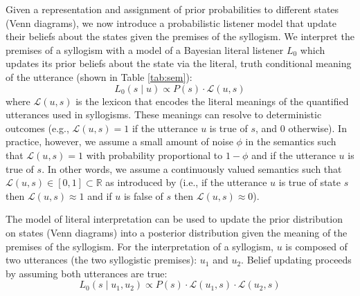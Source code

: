 \documentclass[floatsintext, doc]{apa6}
\begin{document}
Given a representation and assignment of prior probabilities to different states (Venn diagrams), we now introduce a probabilistic listener model that update their beliefs about the states given the premises of the syllogism. 
We interpret the premises of a syllogism with a model of a Bayesian literal listener $L_0$ which updates its prior beliefs about the state via the literal, truth conditional meaning of the utterance (shown in Table \ref{tab:sem}):
\begin{equation}
L_0(s \mid u ) \propto P(s)\cdot \mathcal{L}(u, s) 
\label{eq:L0}
\end{equation}
\noindent where $\mathcal{L}(u, s)$ is the lexicon that encodes the literal meanings of the quantified utterances used in syllogisms. 
These meanings can resolve to deterministic outcomes (e.g., $\mathcal{L}(u, s) = 1$ if the utterance $u$ is true of $s$, and 0 otherwise). 
In practice, however, we assume a small amount of noise $\phi$ in the semantics such that $\mathcal{L}(u, s) = 1$ with probability proportional to $1-\phi$ and if the utterance $u$ is true of $s$.
In other words, we assume a continuously valued semantics such that $\mathcal{L}(u, s) \in [0, 1] \subset \mathbb{R}$ as introduced by  (i.e., if the utterance $u$ is true of state $s$ then $\mathcal{L}(u, s) \approx 1$ and if $u$ is false of $s$ then $\mathcal{L}(u, s) \approx 0$).

The model of literal interpretation can be used to update the prior distribution on states (Venn diagrams) into a posterior distribution given the meaning of the premises of the syllogism. 
For the interpretation of a syllogism, $u$ is composed of two utterances (the two syllogistic premises): $u_1$ and $u_2$. 
Belief updating proceeds by assuming both utterances are true: 
\begin{equation}
L_0(s \mid u_1,  u_2) \propto P(s)\cdot \mathcal{L}(u_1, s) \cdot \mathcal{L}(u_2, s) 
\label{eq:L0premises}
\end{equation}
\end{document}
